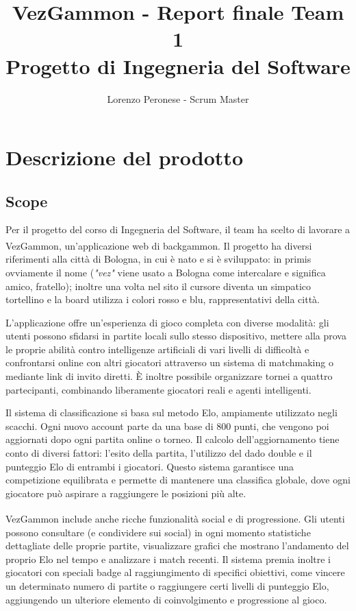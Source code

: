 \documentclass{article}
\title{VezGammon - Report finale Team 1 \\ \large Progetto di Ingegneria del Software}
\author{Lorenzo Peronese - Scrum Master}
\begin{document}
\maketitle

\tableofcontents

\newpage

\section{Descrizione del prodotto}
\subsection{Scope}
Per il progetto del corso di Ingegneria del Software, il team ha scelto di lavorare a VezGammon\textsuperscript{\texttrademark}, un'applicazione web di backgammon. Il progetto ha diversi riferimenti 
alla città di Bologna, in cui è nato e si è sviluppato: in primis ovviamente il nome (\textit{"vez"} viene usato a Bologna come intercalare e significa amico, fratello); 
inoltre una volta nel sito il cursore diventa un simpatico tortellino e la board utilizza i colori rosso e blu, rappresentativi della città. \par
L'applicazione offre un'esperienza di gioco completa con diverse modalità: gli utenti possono sfidarsi in partite locali sullo stesso dispositivo, mettere alla prova 
le proprie abilità contro intelligenze artificiali di vari livelli di difficoltà e confrontarsi online con altri giocatori attraverso un sistema di matchmaking 
o mediante link di invito diretti. È inoltre possibile organizzare tornei a quattro partecipanti, combinando liberamente giocatori reali e agenti intelligenti. \par
Il sistema di classificazione si basa sul metodo Elo, ampiamente utilizzato negli scacchi. Ogni nuovo account parte da una base di 800 punti, che vengono poi 
aggiornati dopo ogni partita online o torneo. Il calcolo dell'aggiornamento tiene conto di diversi fattori: l'esito della partita, l'utilizzo del dado double 
e il punteggio Elo di entrambi i giocatori. Questo sistema garantisce una competizione equilibrata e permette di mantenere una classifica globale, 
dove ogni giocatore può aspirare a raggiungere le posizioni più alte. \par
VezGammon\textsuperscript{\texttrademark} include anche ricche funzionalità social e di progressione. Gli utenti possono consultare (e condividere sui social) in ogni momento statistiche dettagliate delle proprie partite, 
visualizzare grafici che mostrano l'andamento del proprio Elo nel tempo e analizzare i match recenti. Il sistema premia inoltre i giocatori con speciali badge 
al raggiungimento di specifici obiettivi, come vincere un determinato numero di partite o raggiungere certi livelli di punteggio Elo, aggiungendo un ulteriore 
elemento di coinvolgimento e progressione al gioco.
\end{document}
